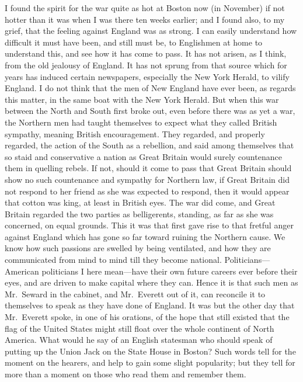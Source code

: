 I found the spirit for the war quite as hot at Boston now (in
November) if not hotter than it was when I was there ten weeks
earlier; and I found also, to my grief, that the feeling against
England was as strong.  I can easily understand how difficult it
must have been, and still must be, to Englishmen at home to
understand this, and see how it has come to pass.  It has not
arisen, as I think, from the old jealousy of England.  It has not
sprung from that source which for years has induced certain
newspapers, especially the New York Herald, to vilify England.  I
do not think that the men of New England have ever been, as regards
this matter, in the same boat with the New York Herald.  But when
this war between the North and South first broke out, even before
there was as yet a war, the Northern men had taught themselves to
expect what they called British sympathy, meaning British
encouragement.  They regarded, and properly regarded, the action of
the South as a rebellion, and said among themselves that so staid
and conservative a nation as Great Britain would surely countenance
them in quelling rebels.  If not, should it come to pass that Great
Britain should show no such countenance and sympathy for Northern
law, if Great Britain did not respond to her friend as she was
expected to respond, then it would appear that cotton was king, at
least in British eyes.  The war did come, and Great Britain
regarded the two parties as belligerents, standing, as far as she
was concerned, on equal grounds.  This it was that first gave rise
to that fretful anger against England which has gone so far toward
ruining the Northern cause.  We know how such passions are swelled
by being ventilated, and how they are communicated from mind to
mind till they become national.  Politicians---American politicians
I here mean---have their own future careers ever before their eyes,
and are driven to make capital where they can.  Hence it is that
such men as Mr.\ Seward in the cabinet, and Mr.\ Everett out of it,
can reconcile it to themselves to speak as they have done of
England.  It was but the other day that Mr.\ Everett spoke, in one
of his orations, of the hope that still existed that the flag of
the United States might still float over the whole continent of
North America.  What would he say of an English statesman who
should speak of putting up the Union Jack on the State House in
Boston?  Such words tell for the moment on the hearers, and help to
gain some slight popularity; but they tell for more than a moment
on those who read them and remember them.

